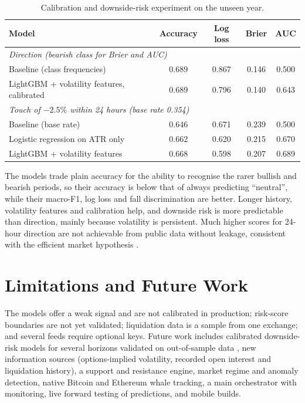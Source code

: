 \documentclass[11pt,a4paper]{article}
\begin{document}
\begin{table}[H]\centering\small
\caption{Calibration and downside-risk experiment on the unseen year.}\label{tab:exp}
\begin{tabular}{lcccc}\toprule
Model & Accuracy & Log loss & Brier & AUC\\\midrule
\multicolumn{5}{l}{\textit{Direction (bearish class for Brier and AUC)}}\\
Baseline (class frequencies) & 0.689 & 0.867 & 0.146 & 0.500\\
LightGBM + volatility features, calibrated & 0.689 & 0.796 & 0.140 & 0.643\\
\multicolumn{5}{l}{\textit{Touch of $-2.5\%$ within 24 hours (base rate 0.354)}}\\
Baseline (base rate) & 0.646 & 0.671 & 0.239 & 0.500\\
Logistic regression on ATR only & 0.662 & 0.620 & 0.215 & 0.670\\
LightGBM + volatility features & 0.668 & 0.598 & 0.207 & 0.689\\\bottomrule
\end{tabular}\end{table}

The models trade plain accuracy for the ability to recognise the rarer bullish and bearish periods, so their accuracy is below that of always predicting ``neutral'', while their macro-F1, log loss and fall discrimination are better. Longer history, volatility features and calibration help, and downside risk is more predictable than direction, mainly because volatility is persistent. Much higher scores for 24-hour direction are not achievable from public data without leakage, consistent with the efficient market hypothesis \cite{fama1970}.

\section{Limitations and Future Work}
The models offer a weak signal and are not calibrated in production; risk-score boundaries are not yet validated; liquidation data is a sample from one exchange; and several feeds require optional keys. Future work includes calibrated downside-risk models for several horizons validated on out-of-sample data \cite{niculescu2005,brier1950}, new information sources (options-implied volatility, recorded open interest and liquidation history), a support and resistance engine, market regime and anomaly detection, native Bitcoin and Ethereum whale tracking, a main orchestrator with monitoring, live forward testing of predictions, and mobile builds.
\end{document}
